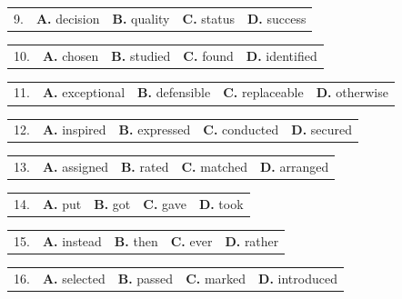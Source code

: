 \documentclass[UTF8,11pt]{ctexart}
\begin{document}
\noindent\begin{tabularx}{\linewidth}{@{}lXXXX@{}}9. & \textbf{A.} decision & \textbf{B.} quality & \textbf{C.} status & \textbf{D.} success\\\end{tabularx}\par

\noindent\begin{tabularx}{\linewidth}{@{}lXXXX@{}}10. & \textbf{A.} chosen & \textbf{B.} studied & \textbf{C.} found & \textbf{D.} identified\\\end{tabularx}\par

\noindent\begin{tabularx}{\linewidth}{@{}lXXXX@{}}11. & \textbf{A.} exceptional & \textbf{B.} defensible & \textbf{C.} replaceable & \textbf{D.} otherwise\\\end{tabularx}\par

\noindent\begin{tabularx}{\linewidth}{@{}lXXXX@{}}12. & \textbf{A.} inspired & \textbf{B.} expressed & \textbf{C.} conducted & \textbf{D.} secured\\\end{tabularx}\par

\noindent\begin{tabularx}{\linewidth}{@{}lXXXX@{}}13. & \textbf{A.} assigned & \textbf{B.} rated & \textbf{C.} matched & \textbf{D.} arranged\\\end{tabularx}\par

\noindent\begin{tabularx}{\linewidth}{@{}lXXXX@{}}14. & \textbf{A.} put & \textbf{B.} got & \textbf{C.} gave & \textbf{D.} took\\\end{tabularx}\par

\noindent\begin{tabularx}{\linewidth}{@{}lXXXX@{}}15. & \textbf{A.} instead & \textbf{B.} then & \textbf{C.} ever & \textbf{D.} rather\\\end{tabularx}\par

\noindent\begin{tabularx}{\linewidth}{@{}lXXXX@{}}16. & \textbf{A.} selected & \textbf{B.} passed & \textbf{C.} marked & \textbf{D.} introduced\\\end{tabularx}\par
\end{document}
